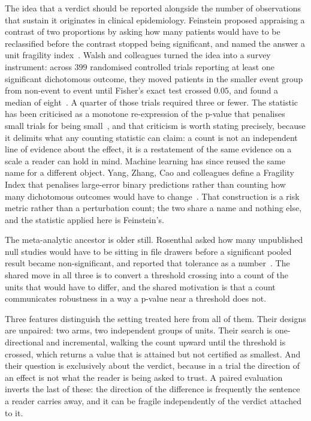 The idea that a verdict should be reported alongside the number of observations
that sustain it originates in clinical epidemiology. Feinstein proposed
appraising a contrast of two proportions by asking how many patients would have
to be reclassified before the contrast stopped being significant, and named the
answer a unit fragility index~\cite{feinstein1990unit}. Walsh and colleagues
turned the idea into a survey instrument: across \(399\) randomised controlled
trials reporting at least one significant dichotomous outcome, they moved
patients in the smaller event group from non-event to event until Fisher's exact
test crossed \(0.05\), and found a median of eight~\cite{walsh2014statistical}.
A quarter of those trials required three or fewer. The statistic has been
criticised as a monotone re-expression of the p-value that penalises small
trials for being small~\cite{carter2017fragility}, and that criticism is worth
stating precisely, because it delimits what any counting statistic can claim: a
count is not an independent line of evidence about the effect, it is a
restatement of the same evidence on a scale a reader can hold in mind.
Machine learning has since reused the same name for a different object. Yang,
Zhang, Cao and colleagues define a Fragility Index that penalises large-error
binary predictions rather than counting how many dichotomous outcomes would
have to change~\cite{yang2023fragility}. That construction is a risk metric
rather than a perturbation count; the two share a name and nothing else, and
the statistic applied here is Feinstein's.

The meta-analytic ancestor is older still. Rosenthal asked how many unpublished
null studies would have to be sitting in file drawers before a significant
pooled result became non-significant, and reported that tolerance as a
number~\cite{rosenthal1979file}. The shared move in all three is to convert a
threshold crossing into a count of the units that would have to differ, and the
shared motivation is that a count communicates robustness in a way a p-value
near a threshold does not.

Three features distinguish the setting treated here from all of them. Their
designs are unpaired: two arms, two independent groups of units. Their search is
one-directional and incremental, walking the count upward until the threshold is
crossed, which returns a value that is attained but not certified as smallest.
And their question is exclusively about the verdict, because in a trial the
direction of an effect is not what the reader is being asked to trust. A paired
evaluation inverts the last of these: the direction of the difference is
frequently the sentence a reader carries away, and it can be fragile
independently of the verdict attached to it.

